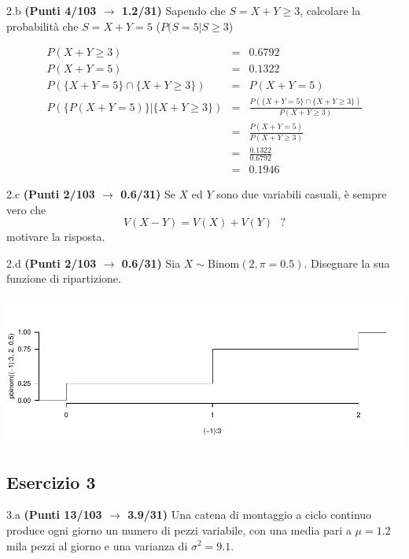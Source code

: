 \documentclass[
  11pt,
]{book}
\theoremstyle{mytheoremstyle}
\theoremstyle{mydefstyle}
\newenvironment{sol}
  {
  \begin{tcolorbox}[enhanced,breakable,arc=0.1mm,boxrule=1pt,colback=white,colframe=iblue,
  title=\bf \fontfamily{lmss}\selectfont \hspace{.5 cm} Soluzione,drop fuzzy shadow]

}{
\end{tcolorbox}
  }
\begin{document}
2.b \textbf{(Punti 4/103 \(\rightarrow\) 1.2/31)} Sapendo che \(S=X+Y\ge 3\), calcolare la probabilità che \(S=X+Y= 5\) (\(P(S=5|S\ge 3\))

\begin{sol}
\begin{eqnarray*}
  P(X+Y\ge 3) &=& 0.6792\\
  P(X+Y=5)    &=& 0.1322\\
  P(\{X+Y=5\}\cap\{X+Y\ge 3\}) &=&P(X+Y=5)\\
  P(\{P(X+Y=5)\}|\{X+Y\ge 3\}) &=&\frac{P(\{X+Y=5\}\cap\{X+Y\ge 3\})}{P(X+Y\ge 3)}\\
  &=&\frac{P(X+Y=5)}{P(X+Y\ge 3)}\\
  &=&\frac{0.1322}{0.6792}\\
  &=&0.1946
\end{eqnarray*}

\end{sol}

2.c \textbf{(Punti 2/103 \(\rightarrow\) 0.6/31)} Se \(X\) ed \(Y\) sono due variabili casuali, è sempre vero che
\[
V(X-Y)=V(X)+V(Y)~~~?
\]
motivare la risposta.

2.d \textbf{(Punti 2/103 \(\rightarrow\) 0.6/31)} Sia \(X\sim\text{Binom}(2,\pi=0.5)\). Disegnare la sua funzione di ripartizione.

\begin{sol}

\begin{center}\includegraphics{Esami_passati_con_soluzioni_files/figure-latex/2023-187-1} \end{center}

\end{sol}

\subsection{Esercizio 3}\label{esercizio-3-27}

3.a \textbf{(Punti 13/103 \(\rightarrow\) 3.9/31)} Una catena di montaggio a ciclo continuo produce ogni giorno un numero di pezzi variabile, con una media pari a
\(\mu=1.2\) mila pezzi al giorno e una varianza di \(\sigma^2=9.1\).
\end{document}

